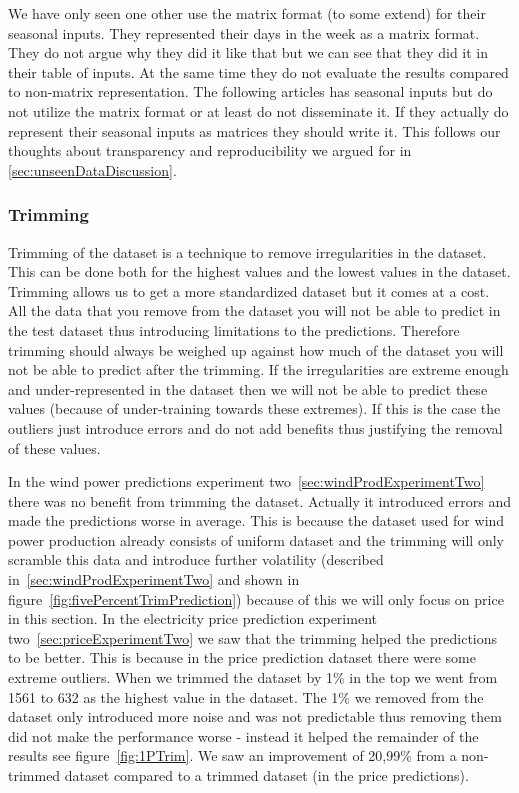 We have only seen one other \cite{crowley2005weather} use the matrix format (to some extend) for their seasonal inputs. They represented their days in the week as a matrix format. They do not argue why they did it like that but we can see that they did it in their table of inputs. At the same time they do not evaluate the results compared to non-matrix representation. The following articles has seasonal inputs but do not utilize the matrix format \cite{szkuta1999electricity, singhal2011electricity} or at least do not disseminate it. If they actually do represent their seasonal inputs as matrices they should write it. This follows our thoughts about transparency and reproducibility we argued for in \ref{sec:unseenDataDiscussion}.

\subsubsection{Trimming}
Trimming of the dataset is a technique to remove irregularities in the dataset. This can be done both for the highest values and the lowest values in the dataset. Trimming allows us to get a more standardized dataset but it comes at a cost. All the data that you remove from the dataset you will not be able to predict in the test dataset thus introducing limitations to the predictions. Therefore trimming should always be weighed up against how much of the dataset you will not be able to predict after the trimming. If the irregularities are extreme enough and under-represented in the dataset then we will not be able to predict these values (because of under-training towards these extremes). If this is the case the outliers just introduce errors and do not add benefits thus justifying the removal of these values.

In the wind power predictions experiment two~\ref{sec:windProdExperimentTwo} there was no benefit from trimming the dataset. Actually it introduced errors and made the predictions worse in average. This is because the dataset used for wind power production already consists of uniform dataset and the trimming will only scramble this data and introduce further volatility (described in~\ref{sec:windProdExperimentTwo} and shown in figure~\ref{fig:fivePercentTrimPrediction}) because of this we will only focus on price in this section. In the electricity price prediction experiment two~\ref{sec:priceExperimentTwo} we saw that the trimming helped the predictions to be better. This is because in the price prediction dataset there were some extreme outliers. When we trimmed the dataset by 1\% in the top we went from 1561 to 632 as the highest value in the dataset. The 1\% we removed from the dataset only introduced more noise and was not predictable thus removing them did not make the performance worse - instead it helped the remainder of the results see figure~\ref{fig:1PTrim}. We saw an improvement of 20,99\% from a non-trimmed dataset compared to a trimmed dataset (in the price predictions).

